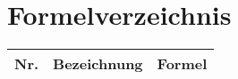 \chapter{Formelverzeichnis}
\label{sec: Formel}

\renewcommand{\arraystretch}{2}

\begin{table}[h]
	\centering
	\begin{tabular}{|c|p{3.8cm}|p{9.8cm}|}
		\hline
		\textbf{Nr.} & \textbf{Bezeichnung} & \textbf{Formel} \\
		\hline
	\end{tabular}
\end{table}